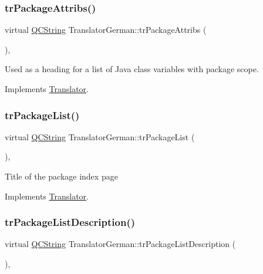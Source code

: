 \subsubsection{\texorpdfstring{trPackageAttribs()}{trPackageAttribs()}}
{\footnotesize\ttfamily virtual \mbox{\hyperlink{class_q_c_string}{Q\+C\+String}} Translator\+German\+::tr\+Package\+Attribs (\begin{DoxyParamCaption}{ }\end{DoxyParamCaption})\hspace{0.3cm}{\ttfamily [inline]}, {\ttfamily [virtual]}}

Used as a heading for a list of Java class variables with package scope. 

Implements \mbox{\hyperlink{class_translator}{Translator}}.

\mbox{\label{class_translator_german_ac2172e032ba255dcbc2953a43ea2a3fd}} 
\subsubsection{\texorpdfstring{trPackageList()}{trPackageList()}}
{\footnotesize\ttfamily virtual \mbox{\hyperlink{class_q_c_string}{Q\+C\+String}} Translator\+German\+::tr\+Package\+List (\begin{DoxyParamCaption}{ }\end{DoxyParamCaption})\hspace{0.3cm}{\ttfamily [inline]}, {\ttfamily [virtual]}}

Title of the package index page 

Implements \mbox{\hyperlink{class_translator}{Translator}}.

\mbox{\label{class_translator_german_a8bd8753934bc6d247bf149e5cad4e4ba}} 
\subsubsection{\texorpdfstring{trPackageListDescription()}{trPackageListDescription()}}
{\footnotesize\ttfamily virtual \mbox{\hyperlink{class_q_c_string}{Q\+C\+String}} Translator\+German\+::tr\+Package\+List\+Description (\begin{DoxyParamCaption}{ }\end{DoxyParamCaption})\hspace{0.3cm}{\ttfamily [inline]}, {\ttfamily [virtual]}}

